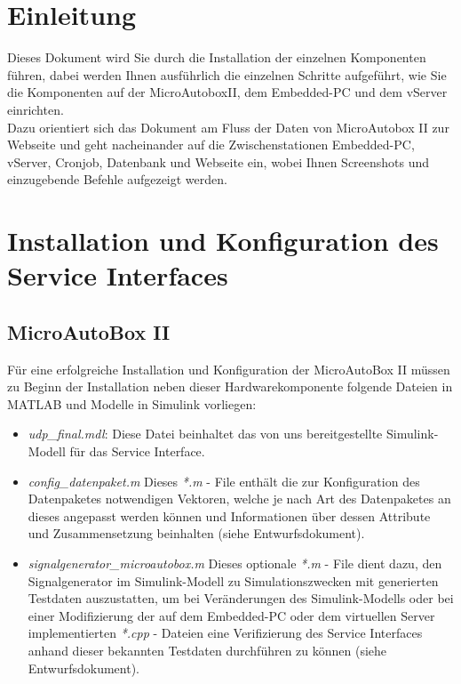 \documentclass[fontsize = 12pt, paper = a4]{scrreprt}
\begin{document}
\chapter{Einleitung}

Dieses Dokument wird Sie durch die Installation der 
einzelnen Komponenten führen, dabei werden Ihnen ausführlich 
die einzelnen Schritte aufgeführt, wie Sie die Komponenten 
auf der MicroAutoboxII, dem Embedded-PC und dem vServer 
einrichten. \\
Dazu orientiert sich das Dokument am Fluss der 
Daten von MicroAutobox II zur Webseite und geht nacheinander 
auf die Zwischenstationen Embedded-PC, vServer, Cronjob, 
Datenbank und Webseite ein, wobei Ihnen Screenshots und 
einzugebende Befehle aufgezeigt werden.


\chapter{Installation und Konfiguration des Service Interfaces}



\section{MicroAutoBox II}

Für eine erfolgreiche Installation und Konfiguration der MicroAutoBox II müssen zu Beginn der Installation neben dieser Hardwarekomponente folgende Dateien in MATLAB und Modelle in Simulink vorliegen:

\begin{itemize}

\item \textit{udp\_final.mdl}: Diese Datei beinhaltet das von uns bereitgestellte Simulink-Modell für das Service Interface.

\item \textit{config\_datenpaket.m} Dieses \textit{*.m} - File enthält die zur Konfiguration des Datenpaketes notwendigen Vektoren, welche je nach Art des Datenpaketes an dieses angepasst werden können und Informationen über dessen Attribute und Zusammensetzung beinhalten (siehe Entwurfsdokument).

\item \textit{signalgenerator\_microautobox.m} Dieses optionale \textit{*.m} - File dient dazu, den Signalgenerator im Simulink-Modell zu Simulationszwecken mit generierten Testdaten auszustatten, um bei Veränderungen des Simulink-Modells oder bei einer Modifizierung der   auf dem Embedded-PC oder dem virtuellen Server implementierten \textit{*.cpp} - Dateien eine Verifizierung des Service Interfaces anhand dieser bekannten Testdaten durchführen zu können (siehe Entwurfsdokument).

\end{itemize} 
\end{document}
